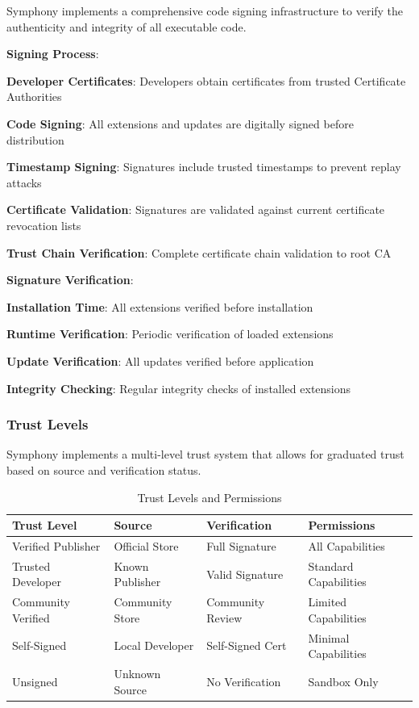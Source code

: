 Symphony implements a comprehensive code signing infrastructure to verify the authenticity and integrity of all executable code.

\textbf{Signing Process}:
\begin{expandedlist}
    \item \textbf{Developer Certificates}: Developers obtain certificates from trusted Certificate Authorities
    \item \textbf{Code Signing}: All extensions and updates are digitally signed before distribution
    \item \textbf{Timestamp Signing}: Signatures include trusted timestamps to prevent replay attacks
    \item \textbf{Certificate Validation}: Signatures are validated against current certificate revocation lists
    \item \textbf{Trust Chain Verification}: Complete certificate chain validation to root CA
\end{expandedlist}

\textbf{Signature Verification}:
\begin{compactlist}
    \item \textbf{Installation Time}: All extensions verified before installation
    \item \textbf{Runtime Verification}: Periodic verification of loaded extensions
    \item \textbf{Update Verification}: All updates verified before application
    \item \textbf{Integrity Checking}: Regular integrity checks of installed extensions
\end{compactlist}

\subsubsection*{Trust Levels}

Symphony implements a multi-level trust system that allows for graduated trust based on source and verification status.

\begin{table}[h]
\centering
\caption{Trust Levels and Permissions}
\label{tab:trust-levels}
\begin{tabular}{@{}llll@{}}
\toprule
\textbf{Trust Level} & \textbf{Source} & \textbf{Verification} & \textbf{Permissions} \\
\midrule
Verified Publisher & Official Store & Full Signature & All Capabilities \\
Trusted Developer & Known Publisher & Valid Signature & Standard Capabilities \\
Community Verified & Community Store & Community Review & Limited Capabilities \\
Self-Signed & Local Developer & Self-Signed Cert & Minimal Capabilities \\
Unsigned & Unknown Source & No Verification & Sandbox Only \\
\bottomrule
\end{tabular}
\end{table}

